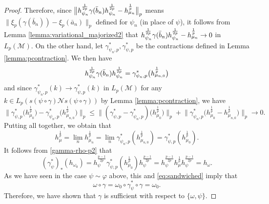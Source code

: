 \documentclass[12pt]{article}
\theoremstyle{definition}
\theoremstyle{remark}
\numberwithin{equation}{section}
\def\Me{\mathcal M}
\def\Ne{\mathcal N}
\def\ffi{\varphi}
\begin{document}
\begin{proof}
Therefore, {since
$\big\|h_{\psi_n}^{\frac 1{2p}}\gamma(\bar b_{n})h_{\psi_n}^{1\over 2p}-h_{\mu_n}^{\frac1p}\big\|_p$
means $\|\xi_p(\gamma(\bar b_n))-\xi_p(\bar a_n)\|_p$ defined for $\psi_n$ (in place of $\psi$),
it follows} from Lemma \ref{lemma:variational_majorized2} that 
$h_{\psi_n}^{\frac 1{2p}}\gamma(\bar b_{n})h_{\psi_n}^{1\over 2p}-h_{\mu_n}^{\frac1p}\to
0$ in $L_p(\Me)$.  On the other hand, let $\gamma^*_{\psi_n,p}, \gamma^*_{\psi,p}$ be the
contractions defined in Lemma \ref{lemma:pcontraction}. We
then have 
\[
h_{\psi_n}^{\frac 1{2p}}\gamma(\bar b_{n})h_{\psi_n}^{1\over
2p}=\gamma_{\psi_{n},p}^*\bigl(h_{\mu_{n,0}}^{\frac1p}\bigr)
\]
and since $\gamma^*_{\psi_{n},p}(k)\to \gamma^*_{\psi,p}(k)$ in $L_p(\Me)$ for any
$k\in L_p(s(\psi\circ\gamma)\Ne s(\psi\circ\gamma))$ by Lemma \ref{lemma:pcontraction}, we have  
\[
\Big\|\gamma^*_{\psi,p}\bigl(h_{\mu_0}^{\frac1p}\bigr)-
\gamma_{\psi_{n},p}^*\bigl(h_{\mu_{n,0}}^{\frac1p}\bigr)\Big\|_p\le
\Big\|(\gamma^*_{\psi,p}-\gamma^*_{\psi_{n},p})\bigl(h_{\mu_0}^{\frac1p}\bigr)\Big\|_p+
\Big\|\gamma^*_{\psi_{n},p}\bigl(h_{\mu_0}^{\frac1p}-h_{\mu_{n,0}}^{\frac1p}\bigr)\Big\|_p\to 0.
\]
Putting all together, we obtain that 
\[
h_\mu^{\frac1p}=\lim_n h_{\mu_n}^{\frac1p}=\lim_n
\gamma^*_{\psi_{n},p}(h_{\mu_{n,0}}^{\frac1p})=\gamma^*_{\psi,p}(h_{\mu_0}^{\frac1p}).
\]
It follows from \eqref{gamma-rho-p2} that 
\[
(\gamma^*_{\psi})_*(h_{\omega_0})=
h_{\psi}^{\frac{p-1}{2p}}\gamma^*_{\psi,p}(h_{\mu_0}^{\frac1p})h_{\psi}^{\frac{p-1}{2p}}=
h_{\psi}^{\frac{p-1}{2p}}h_\mu^{\frac1p}h_{\psi}^{\frac{p-1}{2p}}=h_\omega.
\]
As we have seen {in the case $\psi\sim \ffi$ above,} this and \eqref{eq:sandwiched} imply that
\[
\omega\circ\gamma= \omega_0\circ \gamma_\psi^*\circ\gamma=\omega_0.
\]
{Therefore, we have shown that $\gamma$ is sufficient with respect to $\{\omega,\psi\}$.}


\end{proof}
\end{document}
